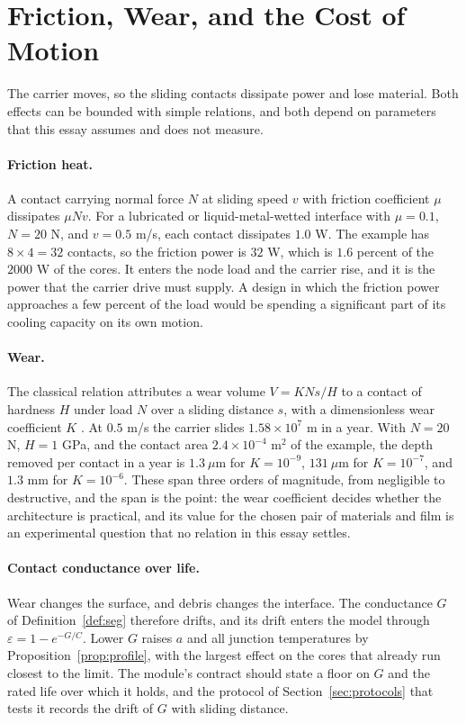 \documentclass[11pt]{article}
\theoremstyle{definition}
\theoremstyle{plain}
\theoremstyle{remark}
\begin{document}
\section{Friction, Wear, and the Cost of Motion}
\label{sec:wear}

The carrier moves, so the sliding contacts dissipate power and lose material. Both effects can be bounded with simple relations, and both depend on parameters that this essay assumes and does not measure.

\paragraph{Friction heat.} A contact carrying normal force $N$ at sliding speed $v$ with friction coefficient $\mu$ dissipates $\mu N v$. For a lubricated or liquid-metal-wetted interface with $\mu=0.1$, $N=20$ N, and $v=0.5$ m/s, each contact dissipates $1.0$ W. The example has $8\times 4=32$ contacts, so the friction power is $32$ W, which is $1.6$ percent of the $2000$ W of the cores. It enters the node load and the carrier rise, and it is the power that the carrier drive must supply. A design in which the friction power approaches a few percent of the load would be spending a significant part of its cooling capacity on its own motion.

\paragraph{Wear.} The classical relation attributes a wear volume $V=KNs/H$ to a contact of hardness $H$ under load $N$ over a sliding distance $s$, with a dimensionless wear coefficient $K$ \cite{archard}. At $0.5$ m/s the carrier slides $1.58\times10^{7}$ m in a year. With $N=20$ N, $H=1$ GPa, and the contact area $2.4\times10^{-4}$ m$^2$ of the example, the depth removed per contact in a year is $1.3\ \mu$m for $K=10^{-9}$, $131\ \mu$m for $K=10^{-7}$, and $1.3$ mm for $K=10^{-6}$. These span three orders of magnitude, from negligible to destructive, and the span is the point: the wear coefficient decides whether the architecture is practical, and its value for the chosen pair of materials and film is an experimental question that no relation in this essay settles.

\paragraph{Contact conductance over life.} Wear changes the surface, and debris changes the interface. The conductance $G$ of Definition~\ref{def:seg} therefore drifts, and its drift enters the model through $\varepsilon=1-e^{-G/C}$. Lower $G$ raises $a$ and all junction temperatures by Proposition~\ref{prop:profile}, with the largest effect on the cores that already run closest to the limit. The module's contract should state a floor on $G$ and the rated life over which it holds, and the protocol of Section~\ref{sec:protocols} that tests it records the drift of $G$ with sliding distance.
\end{document}

